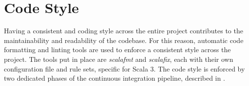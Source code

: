 \section{Code Style} \label{chap:evaluation->sec:code-style}

Having a consistent and  coding style across the entire project contributes to the maintainability and readability of the codebase.
%
For this reason, automatic code formatting and linting tools are used to enforce a consistent style across the project.
%
The tools put in place are \textit{scalafmt} and \textit{scalafix}, each with their own configuration file and rule sets, specific for Scala 3.
%
The code style is enforced by two dedicated phases of the continuous integration pipeline, described in .
